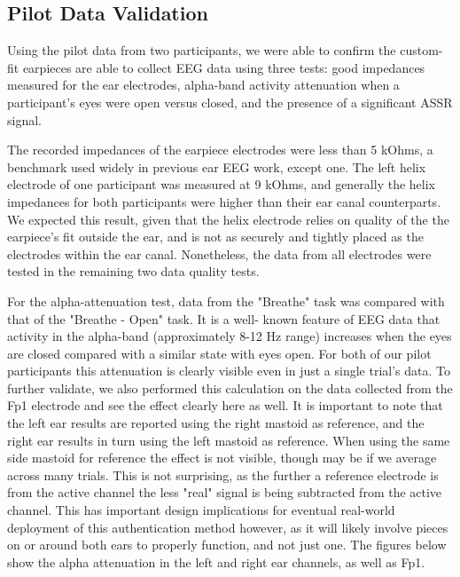 \documentclass[11pt]{article}
\begin{document}
\subsection{Pilot Data Validation}
\label{sec:org28f05cd}

Using the pilot data from two participants, we were able to confirm the custom-fit earpieces are able to collect EEG
data using three tests: good impedances measured for the ear electrodes, alpha-band activity attenuation when a
participant's eyes were open versus closed, and the presence of a significant ASSR signal.

The recorded impedances of the earpiece electrodes were less than 5 kOhms, a benchmark used widely in previous
ear EEG work, except one. The left helix electrode of one participant was measured at 9 kOhms, and generally the 
helix impedances for both participants were higher than their ear canal counterparts. We expected this result, given that the
helix electrode relies on quality of the the earpiece's fit outside the ear, and is not as securely and tightly placed as the
electrodes within the ear canal. Nonetheless, the data from all electrodes were tested in the remaining two data quality tests.

For the alpha-attenuation test, data from the "Breathe" task was compared with that of the "Breathe - Open" task. It is a well-
known feature of EEG data that activity in the alpha-band (approximately 8-12 Hz range) increases when the eyes are closed
compared with a similar state with eyes open. For both of our pilot participants this attenuation is clearly visible even in just
a single trial's data. To further validate, we also performed this calculation on the data collected from the Fp1 electrode and see
the effect clearly here as well. It is important to note that the left ear results are reported using the right mastoid as reference, and
the right ear results in turn using the left mastoid as reference. When using the same side mastoid for reference the effect is not 
visible, though may be if we average across many trials. This is not surprising, as the further a reference electrode is from the active
channel the less "real" signal is being subtracted from the active channel. This has important design implications for eventual 
real-world deployment of this authentication method however, as it will likely involve pieces on or around both ears to properly 
function, and not just one. The figures below show the alpha attenuation in the left and right ear channels, as well as Fp1.
\end{document}
